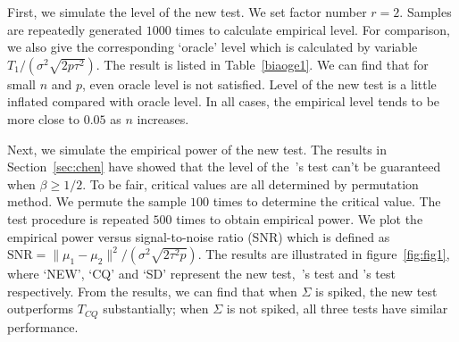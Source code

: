 \documentclass[review]{elsarticle}
\theoremstyle{plain}
\theoremstyle{definition}
\theoremstyle{remark}
\begin{document}
First, we simulate the level of the new test. We set factor number $r=2$.
Samples are repeatedly generated $1000$ times to calculate empirical level.
For comparison, we also give the corresponding `oracle' level which is calculated by variable ${T_1}/(\sigma^2\sqrt{2p\tau^2})$.
The result is listed in
Table~\ref{biaoge1}.
We can find that for small $n$ and $p$, even oracle level is not satisfied.
Level of the new test is a little inflated compared with oracle level.
In all cases, the empirical level tends to be more close to $0.05$ as $n$ increases.


%



Next, we simulate the empirical power of the new test.
The results in Section~\ref{sec:chen} have showed that the level of the~\cite{Chen2010A}'s test can't be guaranteed when $\beta\geq 1/2$.
To be fair,  critical values are all determined by permutation method.
We permute the sample $100$ times to determine the critical value. The test procedure is repeated $500$ times to obtain empirical power.
We plot the empirical power versus signal-to-noise ratio (SNR) which is defined as $\textrm{SNR}=\|\mu_1-\mu_2\|^2/(\sigma^2\sqrt{2\tau^2 p})$.
The results are illustrated in figure~\ref{fig:fig1}, where `NEW', `CQ' and `SD' represent the new test,~\cite{Chen2010A}'s test and \cite{Srivastava2008A}'s test respectively.
From the results, we can find that when $\Sigma$ is spiked, the new test outperforms $T_{CQ}$ substantially; when $\Sigma$ is not spiked, all three tests have similar performance.
\end{document}
